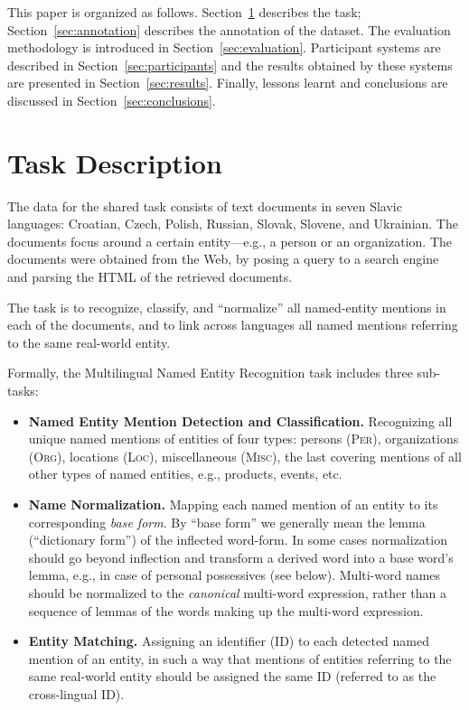 \documentclass[11pt]{article}
\begin{document}
This paper is organized as follows.  Section~\ref{sec:task} describes the task;
Section~\ref{sec:annotation} describes the annotation of the dataset.  The evaluation
methodology is introduced in Section~\ref{sec:evaluation}.  Participant systems are described
in Section~\ref{sec:participants} and the results obtained by these systems are presented in
Section~\ref{sec:results}.  Finally, lessons learnt and conclusions are discussed in
Section~\ref{sec:conclusions}.

\section{Task Description}
\label{sec:task}


The data for the shared task consists of text documents {in seven Slavic languages: Croatian,
  Czech, Polish, Russian, Slovak, Slovene, and Ukrainian. The documents focus around a certain
  entity---e.g., a person or an organization. The documents were obtained from the Web, by
  posing a query to a search engine and parsing the HTML of the retrieved documents.}

The task {is} to recognize, classify, and ``normalize'' all named-entity mentions in each of
the documents, and to link across languages all named mentions referring to the same
real-world entity.

Formally, the Multilingual Named Entity Recognition task includes three
sub-tasks:

\begin{itemize}

\item \textbf{Named Entity Mention Detection and Classification.}
  Recognizing all unique named mentions of entities of four types:
  persons (\textsc{Per}), organizations (\textsc{Org}), locations (\textsc{Loc}), miscellaneous
  (\textsc{Misc}), the last covering mentions of all other types of named
  entities, e.g., products, events, etc.

\item \textbf{Name Normalization.} {Mapping each named mention of an entity to its
    corresponding {\em base form}.  By ``base form'' we generally mean the lemma (``dictionary
    form'') of the inflected word-form.  In some cases normalization should go beyond
    inflection and transform a derived word into a base word's lemma, e.g., in case of
    personal possessives (see below).  Multi-word names should be normalized to the {\em
      canonical} multi-word expression, rather than a sequence of lemmas of the words making
    up the multi-word expression.}

\item \textbf{Entity Matching.} Assigning an identifier (ID) to each detected named mention of
  an entity, in such a way that mentions of entities referring to the same real-world entity
  should be assigned the same ID (referred to as the cross-lingual ID).

\end{itemize}
\end{document}
